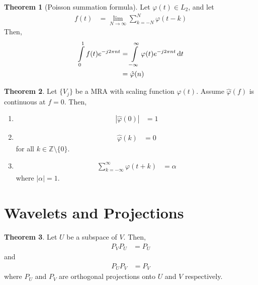 \documentclass[titlepage, fleqn, a4paper, 12pt, twoside]{article}
\theoremstyle{definition}
\theoremstyle{theorem}
\newtheorem{theorem}{Theorem}
\begin{document}
\begin{theorem}[Poisson summation formula]
	Let $\varphi(t) \in L_2$, and let
	\begin{align*}
		f(t) &= \lim\limits_{N \to \infty} \sum\limits_{k = -N}^{N} \varphi(t - k)
	\end{align*}
	Then,
	\begin{align*}
		\int\limits_{0}^{1} f(t) e^{-j 2 \pi n t} &= \int\limits_{-\infty}^{\infty} \varphi(t) e^{-j 2 \pi n t} \dif t\\
		&= \hat{\varphi}(n)
	\end{align*}
	\label{thm:Poisson_summation_formula}
\end{theorem}

\begin{theorem}
	Let $\{V_j\}$ be a MRA with scaling function $\varphi(t)$.
	Assume $\hat{\varphi}(f)$ is continuous at $f = 0$.
	Then,
	\begin{enumerate}
		\item
			\begin{align*}
				\left| \hat{\varphi}(0) \right| &= 1
			\end{align*}
		\item
			\begin{align*}
				\hat{\varphi}(k) &= 0
			\end{align*}
			for all $k \in \mathbb{Z} \setminus \{0\}$.
		\item
			\begin{align*}
				\sum\limits_{k = -\infty}^{\infty} \varphi(t + k) &= \alpha
			\end{align*}
			where $|\alpha| = 1$.
	\end{enumerate}
\end{theorem}

\section{Wavelets and Projections}

\begin{theorem}
	Let $U$ be a subspace of $V$.
	Then,
	\begin{align*}
		P_V P_U &= P_U
	\end{align*}
	and
	\begin{align*}
		P_U P_V &= P_V
	\end{align*}
	where $P_U$ and $P_V$ are orthogonal projections onto $U$ and $V$ respectively.
\end{theorem}
\end{document}
